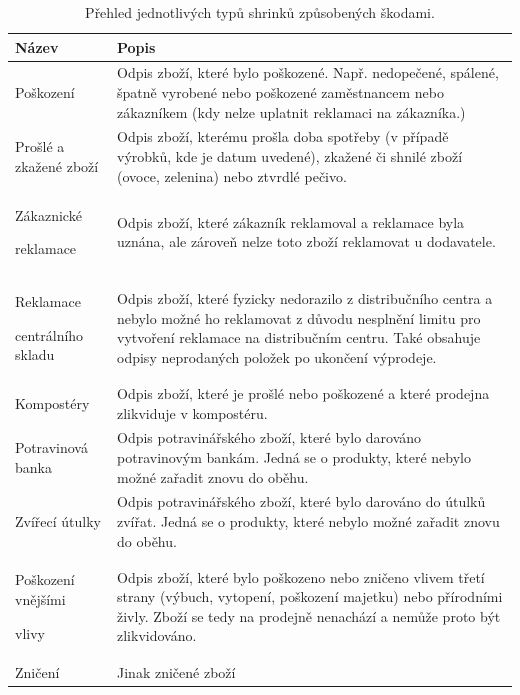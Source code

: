 \begin{table}[hbtp!]
    \caption{Přehled jednotlivých typů shrinků způsobených škodami.}
    \label{tab:sh:dam}
    \begin{tabular}{ p{4cm} p{10.5cm}}
         Název             & Popis \\
    \hline
                Poškození               & Odpis zboží, které bylo poškozené. Např. nedopečené, spálené, špatně vyrobené nebo poškozené zaměstnancem nebo zákazníkem (kdy nelze uplatnit reklamaci na zákazníka.)       \\
                Prošlé a zkažené zboží  & Odpis zboží, kterému prošla doba spotřeby (v případě výrobků, kde je datum uvedené), zkažené či shnilé zboží (ovoce, zelenina) nebo ztvrdlé pečivo.       \\
                Zákaznické \par reklamace \strut  & Odpis zboží, které zákazník reklamoval a reklamace byla uznána, ale zároveň nelze toto zboží reklamovat u dodavatele.      \\
                Reklamace \par centrálního skladu \strut   &  Odpis zboží, které fyzicky nedorazilo z distribučního centra a nebylo možné ho reklamovat z důvodu nesplnění limitu pro vytvoření reklamace na distribučním centru. Také obsahuje odpisy neprodaných položek po ukončení výprodeje.     \\
                Kompostéry              & Odpis zboží, které je prošlé nebo poškozené a které prodejna zlikviduje v kompostéru.       \\
                Potravinová banka       & Odpis potravinářského zboží, které bylo darováno potravinovým bankám. Jedná se o produkty, které nebylo možné zařadit znovu do oběhu.    \\
                Zvířecí útulky          & Odpis potravinářského zboží, které bylo darováno do útulků zvířat. Jedná se o produkty, které nebylo možné zařadit znovu do oběhu.          \\
                Poškození vnějšími \par vlivy \strut %
                                        & Odpis zboží, které bylo poškozeno nebo zničeno vlivem třetí strany (výbuch, vytopení, poškození majetku) nebo přírodními živly. Zboží se tedy na prodejně nenachází a nemůže proto být zlikvidováno.      \\
                Zničení & Jinak zničené zboží \\
    \end{tabular}
\end{table}



\vspace*{1em}